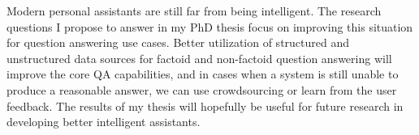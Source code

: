 Modern personal assistants are still far from being intelligent.
The research questions I propose to answer in my PhD thesis focus on improving this situation for question answering use cases.
Better utilization of structured and unstructured data sources for factoid and non-factoid question answering will improve the core QA capabilities, and in cases when a system is still unable to produce a reasonable answer, we can use crowdsourcing or learn from the user feedback.
The results of my thesis will hopefully be useful for future research in developing better intelligent assistants.